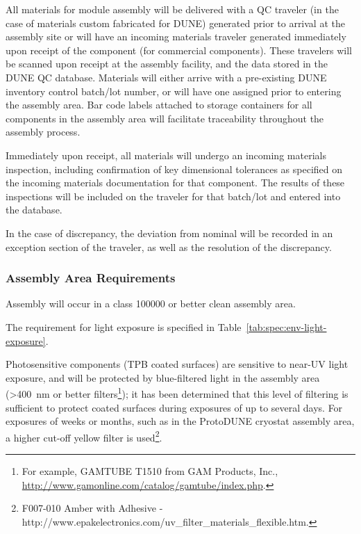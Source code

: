 All materials for  module assembly will be delivered with a QC traveler (in the case of materials custom fabricated for DUNE) generated prior to arrival at the assembly site or will have an incoming materials traveler generated immediately upon receipt of the component (for commercial components).  These travelers will be scanned upon receipt at the assembly facility, and the data stored in the DUNE QC database.  Materials will either arrive with a pre-existing DUNE inventory control batch/lot number, or will have one assigned prior to entering the assembly area.  Bar code labels attached to storage containers for all components in the assembly area will facilitate traceability throughout the assembly process.

Immediately upon receipt, all materials will undergo an incoming materials inspection, including confirmation of key dimensional tolerances as specified on the incoming materials documentation for that component.  The results of these inspections will be included on the traveler for that batch/lot and entered into the database.

In the case of discrepancy, the deviation from nominal will be recorded in an exception section of the traveler, as well as the resolution of the discrepancy.

\subsubsection{Assembly Area Requirements}

Assembly will occur in a class \num{100000} or better clean assembly area.  

The requirement for light exposure is specified in Table~\ref{tab:spec:env-light-exposure}.


Photosensitive components (TPB coated surfaces) are sensitive to near-UV light exposure, and will be protected by blue-filtered light in the assembly area (>\SI{400}{nm} or better filters\footnote{For example, GAMTUBE T1510 from GAM Products, Inc., \url{http://www.gamonline.com/catalog/gamtube/index.php}.}); it has been determined that this level of filtering is sufficient to protect coated surfaces during  exposures of up to several days. For exposures of weeks or months, such as in the ProtoDUNE cryostat assembly area, a higher cut-off yellow filter is used\footnote{F007-010 Amber with Adhesive - http://www.epakelectronics.com/uv\_filter\_materials\_flexible.htm.}. 


